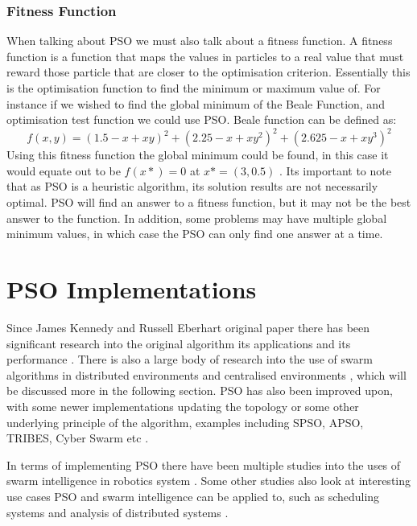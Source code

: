 \documentclass[oneside,12pt]{book}
\begin{document}
\subsubsection{Fitness Function}
When talking about PSO we must also talk about a fitness function. A fitness function is a function that maps the values in particles to a real value that must reward those particle that are closer to the optimisation criterion. Essentially this is the optimisation function to find the minimum or maximum value of. For instance if we wished to find the global minimum of the Beale Function, and optimisation test function we could use PSO. Beale function can be defined as:
\begin{equation}
f(x, y) = (1.5-x+xy)^2+(2.25-x+xy^2)^2+(2.625-x+xy^3)^2
\end{equation}
Using this fitness function the global minimum could be found, in this case it would equate out to be $f(x*)=0$ at $x*=(3,0.5)$ \cite{bingham}. Its important to note that as PSO is a heuristic algorithm, its solution results are not necessarily optimal. PSO will find an answer to a fitness function, but it may not be the best answer to the function. In addition, some problems may have multiple global minimum values, in which case the PSO can only find one answer at a time.

\section{PSO Implementations}
Since James Kennedy and Russell Eberhart original paper there has been significant research into the original algorithm \cite{piotrowski_napiorkowski_piotrowska_2020, bai_2010, imrantextordfeminine2013overview, wang_tan_liu_2017} its applications \cite{hereford_2006, beni_2005, blum_li, raquel2005effective} and its performance \cite{yin_yu_wang_wang_2006, kennedy_1999}. There is also a large body of research into the use of swarm algorithms in distributed environments \cite{akat_gazi_2008, salza_ferrucci_2019, peleg_2005} and centralised environments \cite{trelea_2003, xie2003overview, poli2007particle}, which will be discussed more in the following section. PSO has also been improved upon, with some newer implementations updating the topology or some other underlying principle of the algorithm, examples including SPSO, APSO, TRIBES, Cyber Swarm etc \cite{zhou2009gpu, oca_stutzle_birattari_dorigo_2009, cooren2009performance, yin2010cyber}.

In terms of implementing PSO there have been multiple studies into the uses of swarm intelligence in robotics system \cite{sa_nedjah_mourelle_2016, meng_gan_2008, hereford_2006}. Some other studies also look at interesting use cases PSO and swarm intelligence can be applied to, such as scheduling systems and analysis of distributed systems \cite{li_yang_su_lu_yu_2019, moradi_fotuhi-firuzabad_2008, nouiri_bekrar_jemai_niar_ammari_2015, sahin2007fault}. 
\end{document}
